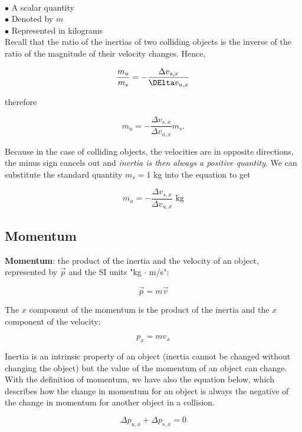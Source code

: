          \\
        $\bullet$ A scalar quantity \\
        $\bullet$ Denoted by $m$ \\
        $\bullet$ Represented in kilograms \\

        Recall that the ratio of the inertias of two colliding objects is the inverse of the ratio of the magnitude of their velocity changes. Hence,

        \[
            \frac{m_u}{m_s} = -\frac{\Delta v_{s,x}}{\DElta v_{u,x}}
        \]

        therefore

        \[
            m_u = -\frac{\Delta v_{s,x}}{\Delta v_{u,x}} m_s.
        \]

        Because in the case of colliding objects, the velocities are in opposite directions, the minus sign cancels out and \textit{inertia is then always a positive quantity}. We can substitute the standard quantity
        $m_s=1$ kg into the equation to get

        \[
            m_u = -\frac{\Delta v_{s,x}}{\Delta v_{u,x}} \text{ kg}
        \]



        \subsection{Momentum}

            \textbf{Momentum}: the product of the inertia and the velocity of an object, represented by $\overrightarrow{p}$ and the SI units "kg $\cdot$ m/s":

            \[
                \overrightarrow{p} = m\overrightarrow{v}
            \]

            The $x$ component of the momentum is the product of the inertia and the $x$ component of the velocity:

            \[
                p_x = mv_x
            \]

            Inertia is an intrinsic property of an object (inertia cannot be changed without changing the object) but the value of the momentum of an object can change. With the definition of momentum, we have also
            the equation below, which describes how the change in momentum for an object is always the negative of the change in momentum for another object in a collision.

            \[
                \Delta p_{u,x} + \Delta p_{s,x} = 0
            \]

